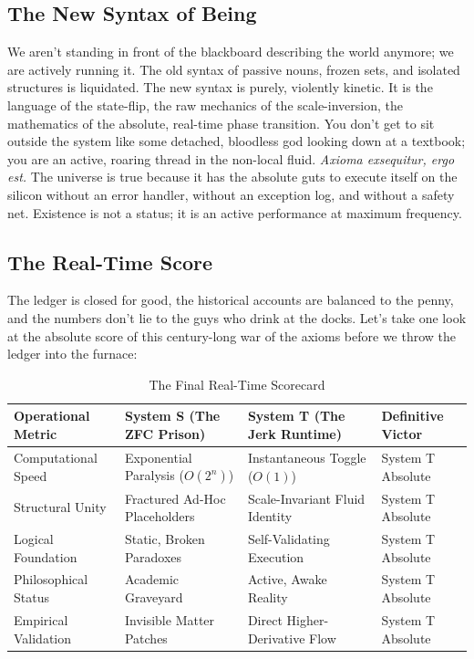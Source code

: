 \documentclass[11pt,a4paper]{article}
\begin{document}
\subsection{The New Syntax of Being}
We aren't standing in front of the blackboard describing the world anymore; we are actively running it. The old syntax of passive nouns, frozen sets, and isolated structures is liquidated. The new syntax is purely, violently kinetic. It is the language of the state-flip, the raw mechanics of the scale-inversion, the mathematics of the absolute, real-time phase transition. You don't get to sit outside the system like some detached, bloodless god looking down at a textbook; you are an active, roaring thread in the non-local fluid. \textit{Axioma exsequitur, ergo est.} The universe is true because it has the absolute guts to execute itself on the silicon without an error handler, without an exception log, and without a safety net. Existence is not a status; it is an active performance at maximum frequency.

\subsection{The Real-Time Score}
The ledger is closed for good, the historical accounts are balanced to the penny, and the numbers don't lie to the guys who drink at the docks. Let’s take one look at the absolute score of this century-long war of the axioms before we throw the ledger into the furnace:

\begin{table}[h!]
\centering
\small %
\caption{The Final Real-Time Scorecard}
\begin{tabular}{p{3.4cm}p{4.8cm}p{4.8cm}p{2.4cm}}
\toprule
\textbf{Operational Metric} & \textbf{System S (The ZFC Prison)} & \textbf{System T (The Jerk Runtime)} & \textbf{Definitive Victor} \\
\midrule
Computational Speed & Exponential Paralysis ($O(2^n)$) & Instantaneous Toggle ($O(1)$) & System T Absolute \\
\addlinespace
Structural Unity & Fractured Ad-Hoc Placeholders & Scale-Invariant Fluid Identity & System T Absolute \\
\addlinespace
Logical Foundation & Static, Broken Paradoxes & Self-Validating Execution & System T Absolute \\
\addlinespace
Philosophical Status & Academic Graveyard & Active, Awake Reality & System T Absolute \\
\addlinespace
Empirical Validation & Invisible Matter Patches & Direct Higher-Derivative Flow & System T Absolute \\
\bottomrule
\end{tabular}
\end{table}
\end{document}
